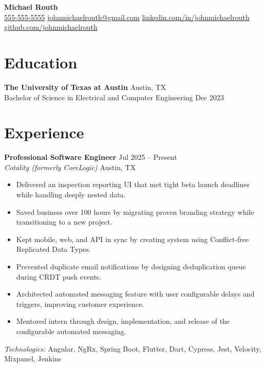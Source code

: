 \documentclass[letterpaper,10pt]{article}
\begin{document}
\begin{center}
    {\LARGE \textbf{Michael Routh}}\\
    {
    \href{tel:+15555555555}{555-555-5555} \textperiodcentered\space
    \href{mailto:JohnMichaelRouth@gmail.com}{johnmichaelrouth@gmail.com} \textperiodcentered\space
    \href{https://www.linkedin.com/in/johnmichaelrouth}{linkedin.com/in/johnmichaelrouth} \textperiodcentered\space
    \href{https://github.com/johnmichaelrouth}{github.com/johnmichaelrouth}
    }
\end{center}


\section*{Education}
\textbf{The University of Texas at Austin} \hfill Austin, TX\\
Bachelor of Science in Electrical and Computer Engineering \hfill Dec 2023

\section*{Experience}

\textbf{Professional Software Engineer} \hfill Jul 2025 -- Present\\
\textit{Cotality (formerly CoreLogic)} \hfill Austin, TX
\begin{itemize}
  \item Delivered an inspection reporting UI that met tight beta launch deadlines while handling deeply nested data.
  \item Saved business over 100 hours by migrating proven branding strategy while transitioning to a new project. 
  \item Kept mobile, web, and API in sync by creating system using Conflict-free Replicated Data Types.
  \item Prevented duplicate email notifications by designing deduplication queue during CRDT push events.
  \item Architected automated messaging feature with user configurable delays and triggers, improving customer experience.
  \item Mentored intern through design, implementation, and release of the configurable automated messaging.
\end{itemize}
\textit{Technologies:} Angular, NgRx, Spring Boot, Flutter, Dart, Cypress, Jest, Velocity, Mixpanel, Jenkins
\end{document}
